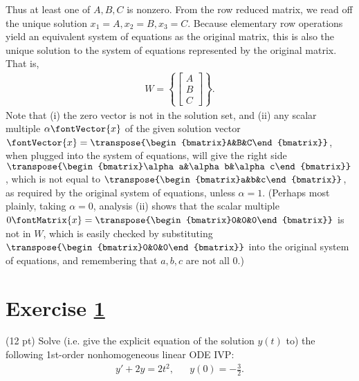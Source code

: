 {Thus at least one of $A,B,C$ is nonzero. From the row reduced matrix, we read off the unique solution $x_{1} = A,x_{2} = B,x_{3} = C$. Because elementary row operations yield an equivalent system of equations as the original matrix, this is also the unique solution to the system of equations represented by the original matrix. That is,
\begin{align*}
W
=
\left\{
\begin{bmatrix}
A	\\
B	\\
C
\end{bmatrix}
\right\}.
\end{align*}
Note that (i) the zero vector is not in the solution set, and (ii) any scalar multiple $\alpha \fontVector{x}$ of the given solution vector $\fontVector{x} = \transpose{\begin{bmatrix}A&B&C\end{bmatrix}}$, when plugged into the system of equations, will give the right side $\transpose{\begin{bmatrix}\alpha a&\alpha b&\alpha c\end{bmatrix}}$, which is not equal to $\transpose{\begin{bmatrix}a&b&c\end{bmatrix}}$, as required by the original system of equations, unless $\alpha = 1$. (Perhaps most plainly, taking $\alpha = 0$, analysis (ii) shows that the scalar multiple $0 \fontMatrix{x} = \transpose{\begin{bmatrix}0&0&0\end{bmatrix}}$ is not in $W$, which is easily checked by substituting $\transpose{\begin{bmatrix}0&0&0\end{bmatrix}}$ into the original system of equations, and remembering that $a,b,c$ are not all $0$.)}%





%
%
%
%


\section{Exercise \ref{sec : Math211 Summer2019 Exam2 Q3}}
\label{sec : Math211 Summer2019 Exam2 Q3}

(12 pt) Solve (i.e. give the explicit equation of the solution $y(t)$ to) the following 1st-order nonhomogeneous linear ODE IVP:
\begin{align*}
y' + 2 y
=
2 t^{2},
&&
y(0)
=
-\frac{3}{2}.
\end{align*}

